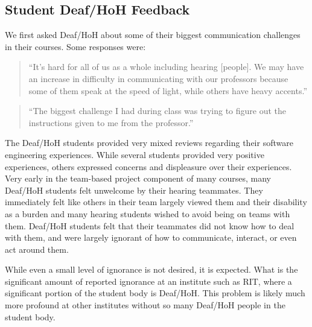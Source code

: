 \documentclass[conference]{IEEEtran}
\begin{document}
\subsection{Student Deaf/HoH Feedback}

We first asked Deaf/HoH about some of their biggest communication challenges in their courses. Some responses were:

\begin{quotation}
``It's hard for all of us as a whole including hearing [people]. We may have an increase in difficulty in communicating with our professors because some of them speak at the speed of light, while others have heavy accents.''
\end{quotation}

\begin{quotation}
``The biggest challenge I had during class was trying to figure out the instructions given to me from the professor.''
\end{quotation}



The Deaf/HoH students provided very mixed reviews regarding their software engineering experiences. While several students provided very positive experiences, others expressed concerns and displeasure over their experiences. Very early in the team-based project component of many courses, many Deaf/HoH students felt unwelcome by their hearing teammates. They immediately felt like others in their team largely viewed them and their disability as a burden and many hearing students wished to avoid being on teams with them. Deaf/HoH students felt that their teammates did not know how to deal with them, and were largely ignorant of how to communicate, interact, or even act around them.

While even a small level of ignorance is not desired, it is expected. What is the significant amount of reported ignorance at an institute such as RIT, where a significant portion of the student body is Deaf/HoH. This problem is likely much more profound at other institutes without so many Deaf/HoH people in the student body.
\end{document}
